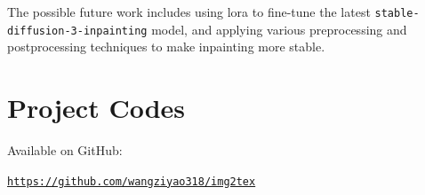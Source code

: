 \documentclass[acmtog]{acmart}
\begin{document}
The possible future work includes using lora to fine-tune the latest \texttt{stable-diffusion-3-inpainting} model, and applying various preprocessing and postprocessing techniques to make inpainting more stable.






\appendix

\section{Project Codes}

Available on GitHub:

\href{https://github.com/wangziyao318/img2tex}{\texttt{https://github.com/wangziyao318/img2tex}}
\end{document}
